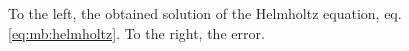 \begin{figure}
  \centering
  \hspace{5pt}
  \caption{To the left, the obtained solution of the Helmholtz
    equation, eq. \eqref{eq:mb:helmholtz}. To the right, the error.}
  \label{traj}
\end{figure}
